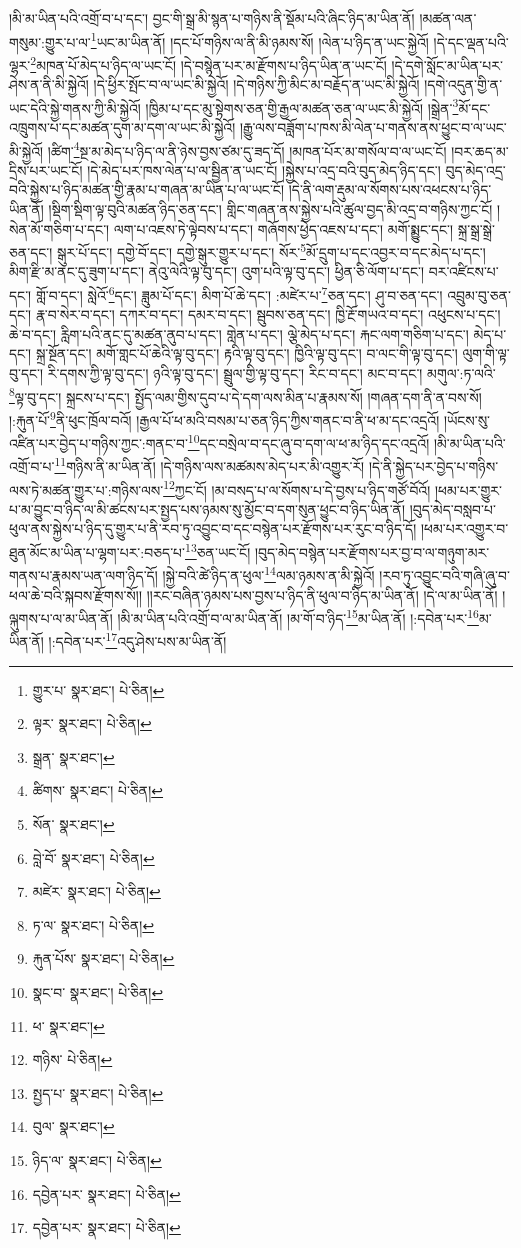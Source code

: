 །མི་མ་ཡིན་པའི་འགྲོ་བ་པ་དང་། བྱང་གི་སྒྲ་མི་སྙན་པ་གཉིས་ནི་སྡོམ་པའི་ཞིང་ཉིད་མ་ཡིན་ནོ། །མཚན་ལན་གསུམ་:གྱུར་པ་ལ་\footnote{གྱུར་པ་  སྣར་ཐང་།  པེ་ཅིན། }ཡང་མ་ཡིན་ནོ། །དང་པོ་གཉིས་ལ་ནི་མི་ཉམས་སོ། །ལེན་པ་ཉིད་ན་ཡང་སྐྱེའོ། །དེ་དང་ལྡན་པའི་ལྷར་\footnote{ལྟར་  སྣར་ཐང་།  པེ་ཅིན། }མཁན་པོ་མེད་པ་ཉིད་ལ་ཡང་ངོ། །དེ་བསྙེན་པར་མ་རྫོགས་པ་ཉིད་ཡིན་ན་ཡང་ངོ། །དེ་དགེ་སློང་མ་ཡིན་པར་ཤེས་ན་ནི་མི་སྐྱེའོ། །དེ་ཕྱིར་སྤོང་བ་ལ་ཡང་མི་སྐྱེའོ། །དེ་གཉིས་ཀྱི་མིང་མ་བརྗོད་ན་ཡང་མི་སྐྱེའོ། །དགེ་འདུན་གྱི་ན་ཡང་དེའི་སྐྱེ་གནས་ཀྱི་མི་སྐྱེའོ། །ཁྱིམ་པ་དང་མུ་སྟེགས་ཅན་གྱི་རྒྱལ་མཚན་ཅན་ལ་ཡང་མི་སྐྱེའོ། །སྒྲེན་\footnote{སྒྲན་  སྣར་ཐང་། }མོ་དང་འཁྲུགས་པ་དང་མཚན་དུག་མ་དག་ལ་ཡང་མི་སྐྱེའོ། །རྒྱུ་ལས་བཟློག་པ་ཁས་མི་ལེན་པ་གནས་ནས་ཕྱུང་བ་ལ་ཡང་མི་སྐྱེའོ། །ཚིག་\footnote{ཚིགས་  སྣར་ཐང་།  པེ་ཅིན། }སྔ་མ་མེད་པ་ཉིད་ལ་ནི་ཉེས་བྱས་ཙམ་དུ་ཟད་དོ། །མཁན་པོར་མ་གསོལ་བ་ལ་ཡང་ངོ། །བར་ཆད་མ་དྲིས་པར་ཡང་ངོ། །དེ་མེད་པར་ཁས་ལེན་པ་ལ་སྦྱིན་ན་ཡང་ངོ། །སྐྱེས་པ་འདྲ་བའི་བུད་མེད་ཉིད་དང་། བུད་མེད་འདྲ་བའི་སྐྱེས་པ་ཉིད་མཚན་གྱི་རྣམ་པ་གཞན་མ་ཡིན་པ་ལ་ཡང་ངོ། །དེ་ནི་ལག་རྡུམ་ལ་སོགས་པས་འཕངས་པ་ཉིད་ཡིན་ནོ། །སྡིག་སྡིག་ལྟ་བུའི་མཚན་ཉིད་ཅན་དང་། གླིང་གཞན་ནས་སྐྱེས་པའི་ཚུལ་བྱད་མི་འདྲ་བ་གཉིས་ཀྱང་ངོ། །སེན་མོ་གཅིག་པ་དང་། ལག་པ་འཇས་ཏེ་ལྟེབས་པ་དང་། གཞོགས་ཕྱེད་འཇས་པ་དང་། མགོ་སྨྱུང་དང་། སྐྲ་སྒྲ་སྒྲེ་ཅན་དང་། སྒུར་པོ་དང་། དགྱེ་བོ་དང་། དགྱེ་སྒུར་གྱུར་པ་དང་། སོར་\footnote{སོན་  སྣར་ཐང་། }མོ་དྲུག་པ་དང་འབྱར་བ་དང་མེད་པ་དང་། མིག་རྫི་མ་ནང་དུ་ཟུག་པ་དང་། ནེའུ་ལེའི་ལྟ་བུ་དང་། འུག་པའི་ལྟ་བུ་དང་། ཕྱིན་ཅི་ལོག་པ་དང་། བར་འཛིངས་པ་དང་། གློ་བ་དང་། སླེའོ་\footnote{བླེ་བོ་  སྣར་ཐང་།  པེ་ཅིན། }དང་། ཟླུམ་པོ་དང་། མིག་པོ་ཆེ་དང་། :མཛེར་པ་\footnote{མཛེར་  སྣར་ཐང་།  པེ་ཅིན། }ཅན་དང་། ཤུ་བ་ཅན་དང་། འབྲུམ་བུ་ཅན་དང་། རྣ་བ་སེར་བ་དང་། དཀར་བ་དང་། དམར་བ་དང་། སྦུབས་ཅན་དང་། ཁྱི་རྔོ་གཡའ་བ་དང་། འཕུངས་པ་དང་། ཆེ་བ་དང་། རླིག་པའི་ནང་དུ་མཚན་ནུབ་པ་དང་། གླེན་པ་དང་། ལྕེ་མེད་པ་དང་། རྐང་ལག་གཅིག་པ་དང་། མེད་པ་དང་། སྐྲ་སྔོན་དང་། མགོ་གླང་པོ་ཆེའི་ལྟ་བུ་དང་། རྟའི་ལྟ་བུ་དང་། ཁྱིའི་ལྟ་བུ་དང་། བ་ལང་གི་ལྟ་བུ་དང་། ལུག་གི་ལྟ་བུ་དང་། རི་དགས་ཀྱི་ལྟ་བུ་དང་། ཉའི་ལྟ་བུ་དང་། སྦྲུལ་གྱི་ལྟ་བུ་དང་། རིང་བ་དང་། མང་བ་དང་། མགུལ་:ཏ་ལའི་\footnote{ཏ་ལ་  སྣར་ཐང་།  པེ་ཅིན། }ལྟ་བུ་དང་། སྐྲངས་པ་དང་། སྤྱོད་ལམ་གྱིས་དུབ་པ་དེ་དག་ལས་མིན་པ་རྣམས་སོ། །གཞན་དག་ནི་ན་བས་སོ། །:རྐུན་པོ་\footnote{རྐུན་པོས་  སྣར་ཐང་།  པེ་ཅིན། }ནི་ཕུང་ཁྲོལ་བའོ། །རྒྱལ་པོ་ཕ་མའི་བསམ་པ་ཅན་ཉིད་ཀྱིས་གནང་བ་ནི་ཕ་མ་དང་འདྲའོ། །ཡོངས་སུ་འཛིན་པར་བྱེད་པ་གཉིས་ཀྱང་:གནང་བ་\footnote{སྣང་བ་  སྣར་ཐང་།  པེ་ཅིན། }དང་བསྲེལ་བ་དང་ཞུ་བ་དག་ལ་ཕ་མ་ཉིད་དང་འདྲའོ། །མི་མ་ཡིན་པའི་འགྲོ་བ་པ་\footnote{ཕ་  སྣར་ཐང་། }གཉིས་ནི་མ་ཡིན་ནོ། །དེ་གཉིས་ལས་མཚམས་མེད་པར་མི་འགྱུར་རོ། །དེ་ནི་སྐྱེད་པར་བྱེད་པ་གཉིས་ལས་ཏེ་མཚན་གྱུར་པ་:གཉིས་ལས་\footnote{གཉིས་  པེ་ཅིན། }ཀྱང་ངོ། །མ་བསད་པ་ལ་སོགས་པ་དེ་བྱས་པ་ཉིད་གཙོ་བོའོ། །ཕམ་པར་གྱུར་པ་མ་བྱུང་བ་ཉིད་ལ་མི་ཚངས་པར་སྤྱད་པས་ཉམས་སུ་མྱོང་བ་དག་སུན་ཕྱུང་བ་ཉིད་ཡིན་ནོ། །བུད་མེད་བསླབ་པ་ཕུལ་ནས་སྐྱེས་པ་ཉིད་དུ་གྱུར་པ་ནི་རབ་ཏུ་འབྱུང་བ་དང་བསྙེན་པར་རྫོགས་པར་རུང་བ་ཉིད་དོ། །ཕམ་པར་འགྱུར་བ་ཐུན་མོང་མ་ཡིན་པ་ལྷག་པར་:བཅད་པ་\footnote{སྤྱད་པ་  སྣར་ཐང་།  པེ་ཅིན། }ཅན་ཡང་ངོ། །བུད་མེད་བསྙེན་པར་རྫོགས་པར་བྱ་བ་ལ་གཉུག་མར་གནས་པ་རྣམས་ཡན་ལག་ཉིད་དོ། །སྐྱེ་བའི་ཚེ་ཉིད་ན་ཕུལ་\footnote{བུལ་  སྣར་ཐང་། }ལམ་ཉམས་ན་མི་སྐྱེའོ། །རབ་ཏུ་འབྱུང་བའི་གཞི་ཞུ་བ་ཕལ་ཆེ་བའི་སྐབས་རྫོགས་སོ།། །།རང་བཞིན་ཉམས་པས་བྱས་པ་ཉིད་ནི་ཕུལ་བ་ཉིད་མ་ཡིན་ནོ། །དེ་ལ་མ་ཡིན་ནོ། །ལྐུགས་པ་ལ་མ་ཡིན་ནོ། །མི་མ་ཡིན་པའི་འགྲོ་བ་ལ་མ་ཡིན་ནོ། །མ་གོ་བ་ཉིད་\footnote{ཉིད་ལ་  སྣར་ཐང་།  པེ་ཅིན། }མ་ཡིན་ནོ། །:དབེན་པར་\footnote{དབྱེན་པར་  སྣར་ཐང་།  པེ་ཅིན། }མ་ཡིན་ནོ། །:དབེན་པར་\footnote{དབྱེན་པར་  སྣར་ཐང་།  པེ་ཅིན། }འདུ་ཤེས་པས་མ་ཡིན་ནོ། 